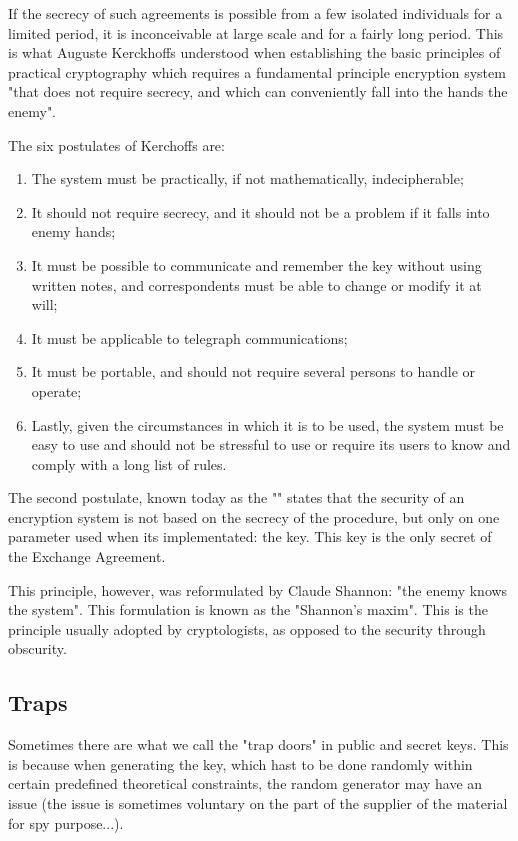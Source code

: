 	If the secrecy of such agreements is possible from a few isolated individuals for a limited period, it is inconceivable at  large scale and for a fairly long period. This is what Auguste Kerckhoffs understood when establishing the basic principles of practical cryptography which requires a fundamental principle encryption system "that does not require secrecy, and which can conveniently fall into the hands the enemy".
	
	The six postulates of Kerchoffs are:
	\begin{enumerate}
		\item The system must be practically, if not mathematically, indecipherable;
		\item It should not require secrecy, and it should not be a problem if it falls into enemy hands;
		\item It must be possible to communicate and remember the key without using written notes, and correspondents must be able to change or modify it at will;
		\item It must be applicable to telegraph communications;
		\item It must be portable, and should not require several persons to handle or operate;
		\item Lastly, given the circumstances in which it is to be used, the system must be easy to use and should not be stressful to use or require its users to know and comply with a long list of rules.
	\end{enumerate}
	The second postulate, known today as the ""  states that the security of an encryption system is not based on the secrecy of the procedure, but only on one parameter used when its implementated: the key. This key is the only secret of the Exchange Agreement.
	
	This principle, however, was reformulated by Claude Shannon: "the enemy knows the system". This formulation is known as the "Shannon's maxim". This is the principle usually adopted by cryptologists, as opposed to the security through obscurity.
	
	\subsection{Traps}
	Sometimes there are what we call the "trap doors" in public and secret keys. This is because when generating the key, which hast to be done randomly within certain predefined theoretical constraints, the random generator may have an issue (the issue is sometimes voluntary on the part of the supplier of the material for spy purpose...).
	

